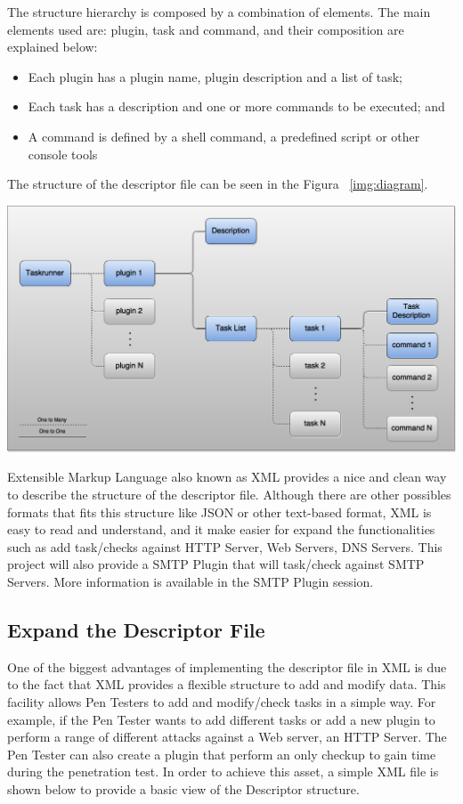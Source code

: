 \documentclass[a4paper, 12pt]{article}
\begin{document}
	The structure hierarchy is composed by a combination of elements. The main elements used are: plugin, task and command, and their composition are
explained below:\\

\begin{itemize}
\item Each plugin has a plugin name, plugin description and a list of task;
\item Each task has a description and one or more commands to be executed; and
\item A command is defined by a shell command, a predefined script or other console tools
\end{itemize}

The structure of the descriptor file can be seen in the Figura ~\ref{img:diagram}.

\noindent
\includegraphics[width=\textwidth]{images/diagram.png}
\label{img:diagram}

	Extensible Markup Language also known as XML provides a nice and clean way to describe the structure of the descriptor file. Although there are other
possibles formats that fits this structure like JSON or other text-based format, XML is easy to read and understand, and it make easier for expand the
functionalities such as add task/checks against HTTP Server, Web Servers, DNS Servers. This project will also provide a SMTP Plugin that will task/check
against SMTP Servers. More information is available in the SMTP Plugin session.\\

\subsection{Expand the Descriptor File}

	One of the biggest advantages of implementing the descriptor file in XML is due to the fact that XML provides a flexible structure to add and modify
data. This facility allows Pen Testers to add and modify/check tasks in a simple way. For example, if the Pen Tester wants to add different tasks or
add a new plugin to perform a range of different attacks against a Web server, an HTTP Server. The Pen Tester can also create a plugin that perform an
only checkup to gain time during the penetration test. In order to achieve this asset, a simple XML file is shown below to provide a basic view of the
Descriptor structure.\\
\end{document}
